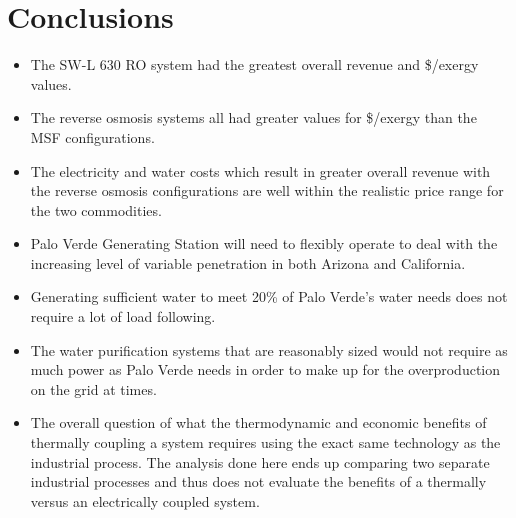 \section{Conclusions}
\begin{itemize}
\item The SW-L 630 RO system had the greatest overall revenue and \$/exergy values.
\item The reverse osmosis systems all had greater values for \$/exergy than the MSF configurations.
\item The electricity and water costs which result in greater overall revenue with the reverse osmosis configurations are well within the realistic price range for the two commodities.
\item Palo Verde Generating Station will need to flexibly operate to deal with the increasing level of variable penetration in both Arizona and California.
\item Generating sufficient water to meet 20\% of Palo Verde's water needs does not require a lot of load following.
\item The water purification systems that are reasonably sized would not require as much power as Palo Verde needs in order to make up for the overproduction on the grid at times.
\item The overall question of what the thermodynamic and economic benefits of thermally coupling a system requires using the exact same technology as the industrial process. The analysis done here ends up comparing two separate industrial processes and thus does not evaluate the benefits of a thermally versus an electrically coupled system.
\end{itemize}
